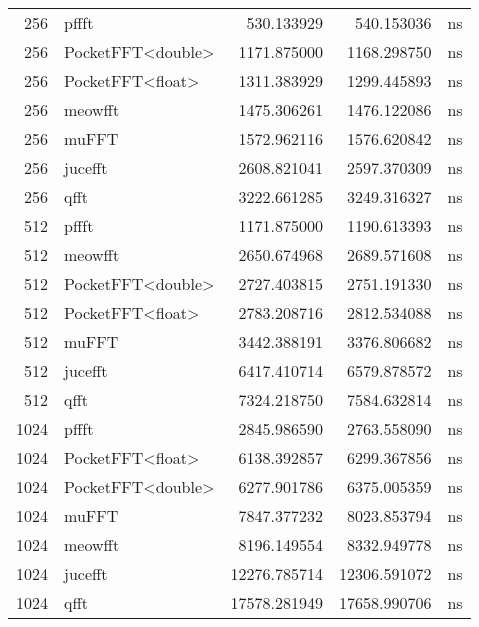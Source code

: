 \begin{tabular}{rlrrl}
256 & pffft & 530.133929 & 540.153036 & ns \\
256 & PocketFFT<double> & 1171.875000 & 1168.298750 & ns \\
256 & PocketFFT<float> & 1311.383929 & 1299.445893 & ns \\
256 & meowfft & 1475.306261 & 1476.122086 & ns \\
256 & muFFT & 1572.962116 & 1576.620842 & ns \\
256 & jucefft & 2608.821041 & 2597.370309 & ns \\
256 & qfft & 3222.661285 & 3249.316327 & ns \\
512 & pffft & 1171.875000 & 1190.613393 & ns \\
512 & meowfft & 2650.674968 & 2689.571608 & ns \\
512 & PocketFFT<double> & 2727.403815 & 2751.191330 & ns \\
512 & PocketFFT<float> & 2783.208716 & 2812.534088 & ns \\
512 & muFFT & 3442.388191 & 3376.806682 & ns \\
512 & jucefft & 6417.410714 & 6579.878572 & ns \\
512 & qfft & 7324.218750 & 7584.632814 & ns \\
1024 & pffft & 2845.986590 & 2763.558090 & ns \\
1024 & PocketFFT<float> & 6138.392857 & 6299.367856 & ns \\
1024 & PocketFFT<double> & 6277.901786 & 6375.005359 & ns \\
1024 & muFFT & 7847.377232 & 8023.853794 & ns \\
1024 & meowfft & 8196.149554 & 8332.949778 & ns \\
1024 & jucefft & 12276.785714 & 12306.591072 & ns \\
1024 & qfft & 17578.281949 & 17658.990706 & ns \\
\bottomrule
\end{tabular}
